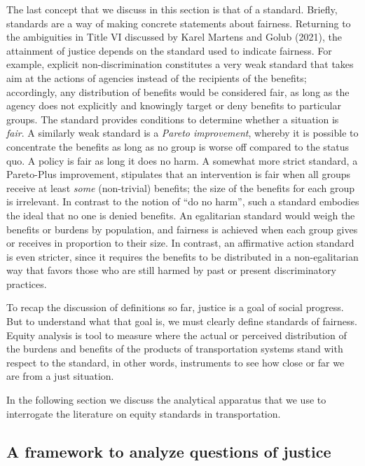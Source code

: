 \documentclass[12pt, oneside]{report}
\begin{document}
The last concept that we discuss in this section is that of a standard.
Briefly, standards are a way of making concrete statements about
fairness. Returning to the ambiguities in Title VI discussed by Karel
Martens and Golub (2021), the attainment of justice depends on the
standard used to indicate fairness. For example, explicit
non-discrimination constitutes a very weak standard that takes aim at
the actions of agencies instead of the recipients of the benefits;
accordingly, any distribution of benefits would be considered fair, as
long as the agency does not explicitly and knowingly target or deny
benefits to particular groups. The standard provides conditions to
determine whether a situation is \emph{fair}. A similarly weak standard
is a \emph{Pareto improvement}, whereby it is possible to concentrate
the benefits as long as no group is worse off compared to the status
quo. A policy is fair as long it does no harm. A somewhat more strict
standard, a Pareto-Plus improvement, stipulates that an intervention is
fair when all groups receive at least \emph{some} (non-trivial)
benefits; the size of the benefits for each group is irrelevant. In
contrast to the notion of ``do no harm'', such a standard embodies the
ideal that no one is denied benefits. An egalitarian standard would
weigh the benefits or burdens by population, and fairness is achieved
when each group gives or receives in proportion to their size. In
contrast, an affirmative action standard is even stricter, since it
requires the benefits to be distributed in a non-egalitarian way that
favors those who are still harmed by past or present discriminatory
practices.

To recap the discussion of definitions so far, justice is a goal of
social progress. But to understand what that goal is, we must clearly
define standards of fairness. Equity analysis is tool to measure where
the actual or perceived distribution of the burdens and benefits of the
products of transportation systems stand with respect to the standard,
in other words, instruments to see how close or far we are from a just
situation.

In the following section we discuss the analytical apparatus that we use
to interrogate the literature on equity standards in transportation.

\hypertarget{sect2.2}{%
\subsection{A framework to analyze questions of justice}\label{sect2.2}}
\end{document}

